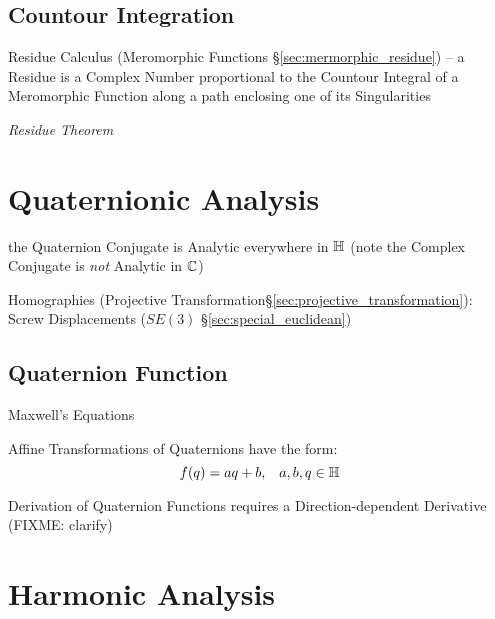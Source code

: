 \subsection{Countour Integration}\label{sec:contour_integration}

Residue Calculus (Meromorphic Functions \S\ref{sec:mermorphic_residue}) -- a
Residue is a Complex Number proportional to the Countour Integral of a
Meromorphic Function along a path enclosing one of its Singularities

\emph{Residue Theorem}



\section{Quaternionic Analysis}\label{sec:quaternionic_analysis}

the Quaternion Conjugate is Analytic everywhere in $\mathbb{H}$
(note the Complex Conjugate is \emph{not} Analytic in $\mathbb{C}$)

Homographies (Projective Transformation\S\ref{sec:projective_transformation}):
Screw Displacements ($SE(3)$ \S\ref{sec:special_euclidean})



\subsection{Quaternion Function}\label{sec:quaternion_function}

Maxwell's Equations

Affine Transformations of Quaternions have the form:
\[
  f(q) = aq + b, \;\;\; a,b,q \in \mathbb{H}
\]

Derivation of Quaternion Functions requires a Direction-dependent Derivative
(FIXME: clarify)



\section{Harmonic Analysis}\label{sec:harmonic_analysis}

